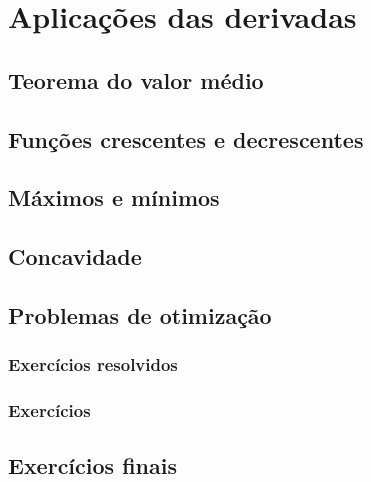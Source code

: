 
\chapter{Aplicações das derivadas}\label{cap:apl_derivadas}

\emconstrucao

\section{Teorema do valor médio}
\construirSec

\section{Funções crescentes e decrescentes}
\construirSec

\section{Máximos e mínimos}
\construirSec

\section{Concavidade}
\construirSec

\section{Problemas de otimização}
\construirSec

\subsection*{Exercícios resolvidos}

\construirExeresol


\subsection*{Exercícios}

\construirExer


\section{Exercícios finais}

\construirExer


